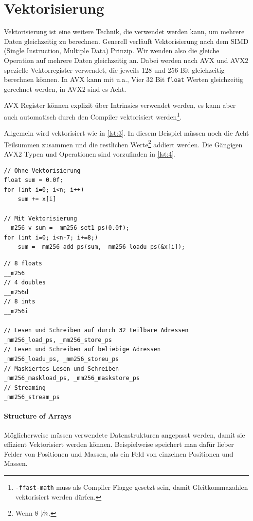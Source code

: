 \section{Vektorisierung}\label{sec:2}
Vektorisierung ist eine weitere Technik, die verwendet werden kann, um mehrere Daten gleichzeitig zu berechnen.
Generell verläuft Vektorisierung nach dem SIMD (Single Instruction, Multiple Data) Prinzip.
Wir wenden also die gleiche Operation auf mehrere Daten gleichzeitig an.
Dabei werden nach AVX und AVX2 spezielle Vektorregister verwendet, die jeweils 128 und 256 Bit gleichzeitig berechnen können.
In AVX kann mit u.a., Vier 32 Bit \lstinline|float| Werten gleichzeitig gerechnet werden, in AVX2 sind es Acht.

AVX Register können explizit über Intrinsics verwendet werden, es kann aber auch automatisch durch den Compiler vektorisiert werden\footnote{\texttt{-ffast-math} muss als Compiler Flagge gesetzt sein, damit Gleitkommazahlen vektorisiert werden dürfen.}.

Allgemein wird vektorisiert wie in \autoref{lst:3}.
In diesem Beispiel müssen noch die Acht Teilsummen zusammen und die restlichen Werte\footnote{Wenn \(8 \not\mid n\).} addiert werden.
Die Gängigen AVX2 Typen und Operationen sind vorzufinden in \autoref{lst:4}.

\begin{lstlisting}[label={lst:3}, caption={Explizite Vektorisierung mit AVX2.}]
// Ohne Vektorisierung
float sum = 0.0f;
for (int i=0; i<n; i++)
    sum += x[i]

// Mit Vektorisierung
__m256 v_sum = _mm256_set1_ps(0.0f);
for (int i=0; i<n-7; i+=8;)
    sum = _mm256_add_ps(sum, _mm256_loadu_ps(&x[i]);
\end{lstlisting}

\begin{lstlisting}[label={lst:4}, caption={Wichtige AVX2 Typen und Operationen auf 8 \lstinline|float| Werten.}]
// 8 floats
__m256
// 4 doubles
__m256d
// 8 ints
__m256i

// Lesen und Schreiben auf durch 32 teilbare Adressen
_mm256_load_ps, _mm256_store_ps
// Lesen und Schreiben auf beliebige Adressen
_mm256_loadu_ps, _mm256_storeu_ps
// Maskiertes Lesen und Schreiben
_mm256_maskload_ps, _mm256_maskstore_ps
// Streaming
_mm256_stream_ps
\end{lstlisting}

\paragraph{Structure of Arrays}
Möglicherweise müssen verwendete Datenstrukturen angepasst werden, damit sie effizient Vektorisiert werden können.
Beispielweise speichert man dafür lieber Felder von Positionen und Massen, als ein Feld von einzelnen Positionen und Massen.

